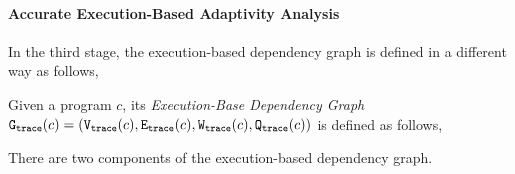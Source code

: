 \paragraph{Accurate Execution-Based Adaptivity Analysis}
\label{subsec:refine-exe-adapt}
%
In the third stage, the execution-based dependency graph is defined in a different way as follows,
\begin{defn}
    \label{def:trace_graph}
    Given a program ${c}$,
    its \emph{Execution-Base Dependency Graph} 
    $\mathtt{{G_{trace}}}({c}) = (\mathtt{{V_{trace}}}({c}), \mathtt{{E_{trace}}}({c}), \mathtt{{W_{trace}}}({c}), \mathtt{{Q_{trace}}}({c}))$ is defined as follows,
    \highlight{\small
    \[
    \begin{array}{lcl}
      \traceV({c}) & := & 
      \{ 
      (x^l, w) 
      ~ \vert ~ 
      w : \mathcal{T} \to \mathbb{N}
      \land
      x^l \in \lvar(c) 
      \\ & &
      \land
      \forall \trace \in \mathcal{T}_0(c), \trace' \in \mathcal{T} \sthat \config{{c}, \trace} \to^{*} \config{\eskip, \trace\tracecat\vtrace'} 
      \implies w(\trace) = \vcounter(\vtrace', l) 
    \}
      \\
      \traceE({c}) & := & 
      \{ 
      (x^i, w, y^j) 
      ~ \vert ~
      x^i, y^j \in \lvar(c)
      \land w \in \mathcal{P}( \mathcal{T}_0(c) \to \mathbb{N})
      \land 
      \exists \trace \in \mathcal{T}_0(c), 
      \trace_1, \trace_2 \in \mathcal{T} \sthat \dep(x^i, y^j,\trace_1, \trace_2, \trace_0, c)
      \\ & &
      \land \forall \trace_0 \in \mathcal{T}_0(c) \sthat
      w (\trace_0) = \max \left\{ | \sdiff(\trace_1, \trace_2, y)|
      ~\middle\vert~
      \forall \trace_1, \trace_2 \in \mathcal{T} \sthat \dep(x^i, y^j,\trace_1, \trace_2, \trace_0, c) \right\}
      \}
    \end{array}
    \]
    }
    \end{defn}
    There are two components of the execution-based dependency graph. 
    \\
